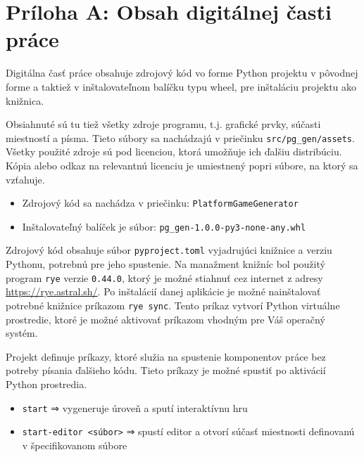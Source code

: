 \setcounter{page}{1}
\renewcommand{\thepage}{A.\arabic{page}}

\section*{Príloha A: Obsah digitálnej časti práce}

Digitálna časť práce obsahuje zdrojový kód vo forme Python projektu v pôvodnej forme a taktiež v inštalovateľnom balíčku typu wheel, pre inštaláciu projektu ako knižnica.

Obsiahnuté sú tu tiež všetky zdroje programu, t.j. grafické prvky, súčasti miestností a písma. Tieto súbory sa nachádzajú v priečinku \texttt{src/pg\_gen/assets}. Všetky použité zdroje sú pod licenciou, ktorá umožňuje ich ďalšiu distribúciu. Kópia alebo odkaz na relevantnú licenciu je umiestnený popri súbore, na ktorý sa vzťahuje. 

\begin{itemize}
    \item Zdrojový kód sa nachádza v priečinku: \texttt{PlatformGameGenerator} 
    \item Inštalovateľný balíček je súbor: \texttt{pg\_gen-1.0.0-py3-none-any.whl}
\end{itemize}

Zdrojový kód obsahuje súbor \texttt{pyproject.toml} vyjadrujúci knižnice a verziu Pythonu, potrebnú pre jeho spustenie. Na manažment knižníc bol použitý program \texttt{rye} verzie \texttt{0.44.0}, ktorý je možné stiahnuť cez internet z adresy \url{https://rye.astral.sh/}. Po inštalácií danej aplikácie je možné nainštalovať potrebné knižnice príkazom \texttt{rye sync}. Tento príkaz vytvorí Python virtuálne prostredie, ktoré je možné aktivovať príkazom vhodným pre Váš operačný systém.

Projekt definuje príkazy, ktoré služia na spustenie komponentov práce bez potreby písania ďalšieho kódu. Tieto príkazy je možné spustiť po aktivácií Python prostredia.

\begin{itemize}
    \item \texttt{start} ⇒ vygeneruje úroveň a sputí interaktívnu hru
    \item \texttt{start-editor <súbor>} ⇒ spustí editor a otvorí súčasť miestnosti definovanú v špecifikovanom súbore
\end{itemize}

\newpage
\setcounter{page}{1}
\renewcommand{\thepage}{B.\arabic{page}}

